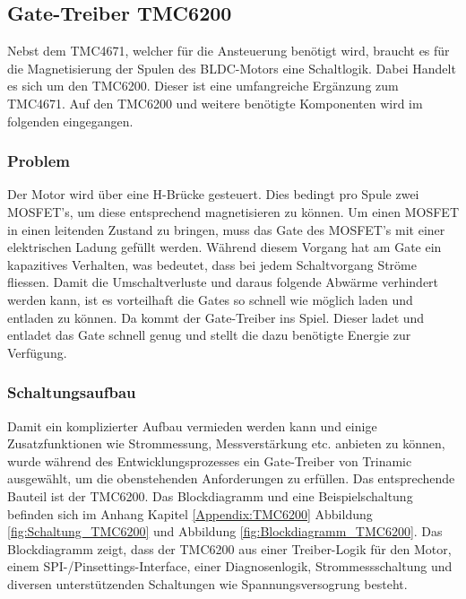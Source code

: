 \subsection{Gate-Treiber TMC6200}\label{subsec:Detailkonzept_Gate_Treiber_TMC6200}
Nebst dem TMC4671, welcher für die Ansteuerung benötigt wird, braucht es für die Magnetisierung der Spulen des BLDC-Motors eine Schaltlogik. Dabei Handelt es sich um den TMC6200. Dieser ist eine umfangreiche Ergänzung zum TMC4671. Auf den TMC6200 und weitere benötigte Komponenten wird im folgenden eingegangen.
\subsubsection{Problem}\label{subsubsec:Problem_TMC6200}

Der Motor wird über eine H-Brücke gesteuert. Dies bedingt pro Spule zwei MOSFET's, um diese entsprechend magnetisieren zu können. Um einen MOSFET in einen leitenden Zustand zu bringen, muss das Gate des MOSFET's mit einer elektrischen Ladung gefüllt werden. Während diesem Vorgang hat am Gate ein kapazitives Verhalten, was bedeutet, dass bei jedem Schaltvorgang Ströme fliessen. Damit die Umschaltverluste und daraus folgende Abwärme verhindert werden kann, ist es vorteilhaft die Gates so schnell wie möglich laden und entladen zu können. Da kommt der Gate-Treiber ins Spiel. Dieser ladet und entladet das Gate schnell genug und stellt die dazu benötigte Energie zur Verfügung.

\subsubsection{Schaltungsaufbau}\label{subsubsec:Schaltungsaufbau_TMC6200}

Damit ein komplizierter Aufbau vermieden werden kann und einige Zusatzfunktionen wie Strommessung, Messverstärkung etc. anbieten zu können, wurde während des Entwicklungsprozesses ein Gate-Treiber von Trinamic ausgewählt, um die obenstehenden Anforderungen zu erfüllen. Das entsprechende Bauteil ist der TMC6200. Das Blockdiagramm und eine Beispielschaltung befinden sich im Anhang Kapitel \ref{Appendix:TMC6200} Abbildung \ref{fig:Schaltung_TMC6200} und Abbildung \ref{fig:Blockdiagramm_TMC6200}. Das Blockdiagramm zeigt, dass der TMC6200 aus einer Treiber-Logik für den Motor, einem SPI-/Pinsettings-Interface, einer Diagnosenlogik, Strommessschaltung und diversen unterstützenden Schaltungen wie Spannungsversogrung besteht.

